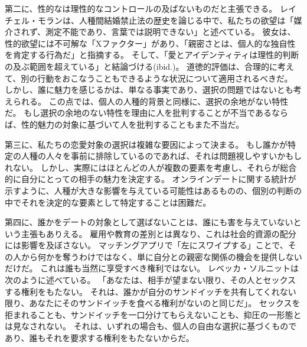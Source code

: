 \documentclass[paper=a4,book,openany]{jlreq}
\begin{document}
第二に、性的なは理性的なコントロールの及ばないものだと主張できる。
レイチェル・モランは、人種間結婚禁止法の歴史を論じる中で、私たちの欲望は「媒介されず、測定不能であり、言葉では説明できない」と述べている\citep[p.14]{moran01:_inter_intim}。
彼女は、性的欲望には不可解な「Xファクター」があり、「親密さとは、個人的な独自性を肯定する行為だ」と指摘する。
そして、「愛とアイデンティティは理性的判断の及ぶ範囲を超えている」と結論づける(ibid.)。
道徳的評価は、合理的に考えて、別の行動をおこなうこともできるような状況について適用されるべきだ。
しかし、誰に魅力を感じるかは、単なる事実であり、選択の問題ではないとも考えられる。
この点では、個人の人種的背景と同様に、選択の余地がない特性だ。
もし選択の余地のない特性を理由に人を批判することが不当であるならば、性的魅力の対象に基づいて人を批判することもまた不当だ。

第三に、私たちの恋愛対象の選択は複雑な要因によって決まる。
もし誰かが特定の人種の人々を事前に排除しているのであれば、それは問題視しやすいかもしれない。
しかし、実際にはほとんどの人が複数の要素を考慮し、それらが総合的に自分にとっての相手の魅力を決定する。
オンラインデートに関する統計が示すように、人種が大きな影響を与えている可能性はあるものの、個別の判断の中でそれを決定的な要素として特定することは困難だ。

第四に、誰かをデートの対象として選ばないことは、誰にも害を与えていないという主張もありえる。
雇用や教育の差別とは異なり、これは社会的資源の配分には影響を及ぼさない。
マッチングアプリで「左にスワイプする」ことで、その人から何かを奪うわけではなく、単に自分との親密な関係の機会を提供しないだけだ。
これは誰も当然に享受すべき権利ではない。
レベッカ・ソルニットは次のように述べている。
「あなたは、相手が望まない限り、その人とセックスする権利をもたない。
それは、誰かが自分のサンドイッチを共有してくれない限り、あなたにそのサンドイッチを食べる権利がないのと同じだ」\citep{solnit15:_men_explain_lolit_me}。
セックスを拒まれることも、サンドイッチを一口分けてもらえないことも、抑圧の一形態とは見なされない。
それは、いずれの場合も、個人の自由な選択に基づくものであり、誰もそれを要求する権利をもたないからだ。
\end{document}
